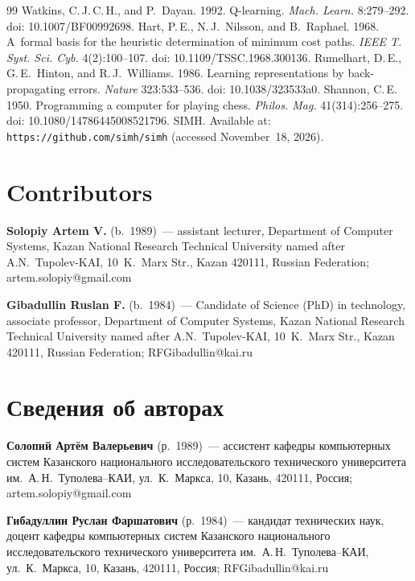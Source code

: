 \documentclass[a4paper,12pt]{article}
\newcommand{\Contr}{\section*{\protect\rmfamily Contributors}\noindent}
\begin{document}
{\begin{thebibliography}{99}
Watkins, C.\,J.\,C.\,H., and P.~Dayan. 1992. Q-learning. \textit{Mach. Learn.} 8:279--292. doi: 10.1007/BF00992698.
Hart, P.\,E., N.\,J.~Nilsson, and B.~Raphael. 1968. A~formal basis for the heuristic determination of minimum cost paths. \textit{IEEE T. Syst. Sci. Cyb.} 4(2):100--107. doi: 10.1109/TSSC.1968.300136.
Rumelhart, D.\,E., G.\,E.~Hinton, and R.\,J.~Williams. 1986. Learning representations by back-propagating errors. \textit{Nature} 323:533--536. doi: 10.1038/323533a0.
Shannon, C.\,E. 1950. Programming a computer for playing chess. \textit{Philos. Mag.} 41(314):256--275. doi: 10.1080/14786445008521796.
SIMH. Available at: \texttt{https://github.com/simh/simh} (accessed November~18, 2026).
\end{thebibliography}
}

\Contr
\textbf{Solopiy Artem V.} (b.~1989)~--- assistant lecturer, Department of Computer Systems, Kazan National Research Technical University named after A.N.~Tupolev-KAI, 10~K.~Marx Str., Kazan 420111, Russian Federation; \mbox{artem.solopiy@gmail.com}

\smallskip
\noindent
\textbf{Gibadullin Ruslan F.} (b.~1984)~--- Candidate of Science (PhD) in technology, associate professor, Department of Computer Systems, Kazan National Research Technical University named after A.N.~Tupolev-KAI, 10~K.~Marx Str., Kazan 420111, Russian Federation; \mbox{RFGibadullin@kai.ru}

\section*{\protect\rmfamily Сведения об авторах}\noindent
\textbf{Солопий Артём Валерьевич} (р.~1989)~--- ассистент кафедры компьютерных систем Казанского национального исследовательского технического университета им.\ А.\,Н.~Туполева--КАИ, ул.\ К.\ Маркса, 10, Казань, 420111, Россия; \mbox{artem.solopiy@gmail.com}

\smallskip
\noindent
\textbf{Гибадуллин Руслан Фаршатович} (р.~1984)~--- кандидат технических наук, доцент кафедры компьютерных систем Казанского национального исследовательского технического университета им.\ А.\,Н.~Туполева--КАИ, ул.\ К.\ Маркса, 10, Казань, 420111, Россия; \mbox{RFGibadullin@kai.ru}
\end{document}
